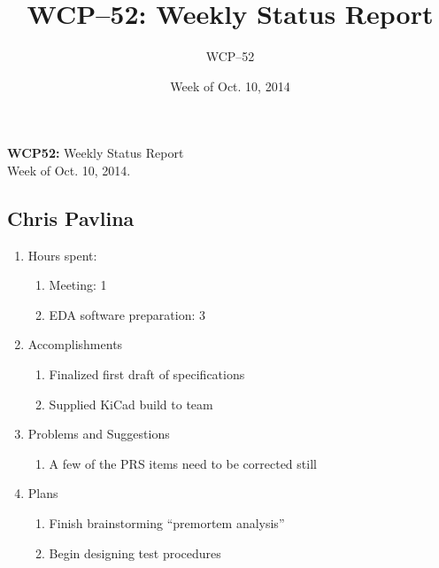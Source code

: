 \documentclass{article}
\title{WCP--52: Weekly Status Report}
\date{Week of Oct. 10, 2014}
\author{WCP--52}
\begin{document}
\noindent \textbf{WCP52:} Weekly Status Report \\
Week of Oct. 10, 2014.

\subsection*{Chris Pavlina}
\begin{enumerate}
\item{Hours spent:
    \begin{enumerate}
    \item{Meeting: 1}
    \item{EDA software preparation: 3}
    \end{enumerate}
}
\item{Accomplishments
    \begin{enumerate}
    \item{Finalized first draft of specifications}
    \item{Supplied KiCad build to team}
    \end{enumerate}
}
\item{Problems and Suggestions
    \begin{enumerate}
    \item{A few of the PRS items need to be corrected still}
    \end{enumerate}
}
\item{Plans
    \begin{enumerate}
    \item{Finish brainstorming ``premortem analysis''}
    \item{Begin designing test procedures}
    \end{enumerate}
}
\end{enumerate}
\end{document}
